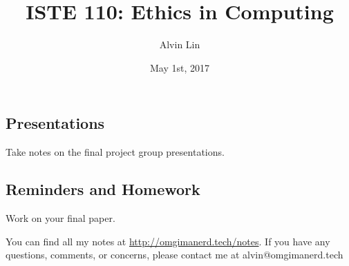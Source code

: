 \documentclass{article}
\title{ISTE 110: Ethics in Computing}
\author{Alvin Lin}
\date{May 1st, 2017}
\begin{document}
\maketitle

\subsection*{Presentations}
Take notes on the final project group presentations.

\subsection*{Reminders and Homework}
Work on your final paper.

\begin{center}
  You can find all my notes at \url{http://omgimanerd.tech/notes}. If you have
  any questions, comments, or concerns, please contact me at
  alvin@omgimanerd.tech
\end{center}
\end{document}
